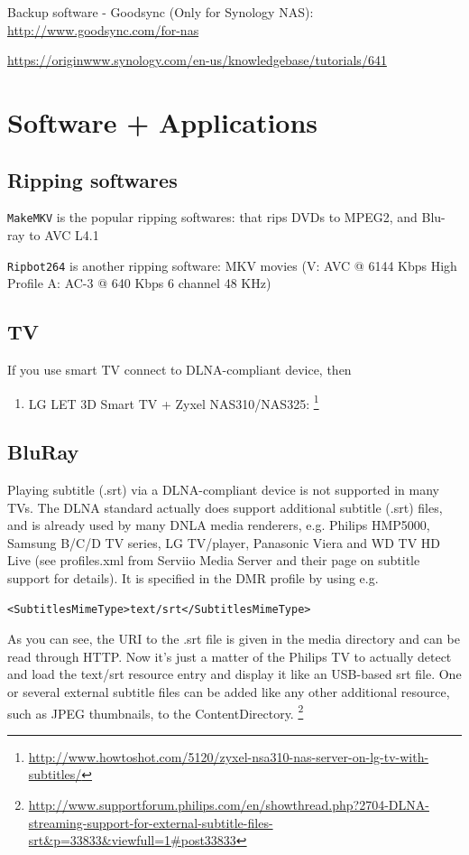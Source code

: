 Backup software - Goodsync (Only for Synology NAS):
\url{http://www.goodsync.com/for-nas}

\url{https://originwww.synology.com/en-us/knowledgebase/tutorials/641}

\section{Software + Applications}

\subsection{Ripping softwares}

\verb!MakeMKV! is the popular ripping softwares: that rips DVDs to MPEG2, and
Blu-ray to AVC L4.1


\verb!Ripbot264! is another ripping software: MKV movies (V: AVC @ 6144 Kbps High Profile
A: AC-3 @ 640 Kbps 6 channel 48 KHz)


\subsection{TV}

If you use smart TV connect to DLNA-compliant device, then 

\begin{enumerate}
  \item LG LET 3D Smart TV + Zyxel NAS310/NAS325:
  \footnote{\url{http://www.howtoshot.com/5120/zyxel-nsa310-nas-server-on-lg-tv-with-subtitles/}}
  
\end{enumerate}


\subsection{BluRay}


Playing subtitle (.srt) via a DLNA-compliant device is not supported in many
TVs. The DLNA standard actually does support additional subtitle (.srt) files,
and is already used by many DNLA media renderers, e.g. Philips HMP5000, Samsung B/C/D
TV series, LG TV/player, Panasonic Viera and WD TV HD Live (see profiles.xml
from Serviio Media Server and their page on subtitle support for details).
It is specified in the DMR profile by using e.g.
\begin{verbatim}
<SubtitlesMimeType>text/srt</SubtitlesMimeType>
\end{verbatim}

As you can see, the URI to the .srt file is given in the media directory and can
be read through HTTP.
Now it's just a matter of the Philips TV to actually detect and load the
text/srt resource entry and display it like an USB-based srt file. One or
several external subtitle files can be added like any other additional resource,
such as JPEG thumbnails, to the ContentDirectory.
\footnote{\url{http://www.supportforum.philips.com/en/showthread.php?2704-DLNA-streaming-support-for-external-subtitle-files-srt&p=33833&viewfull=1\#post33833}}



